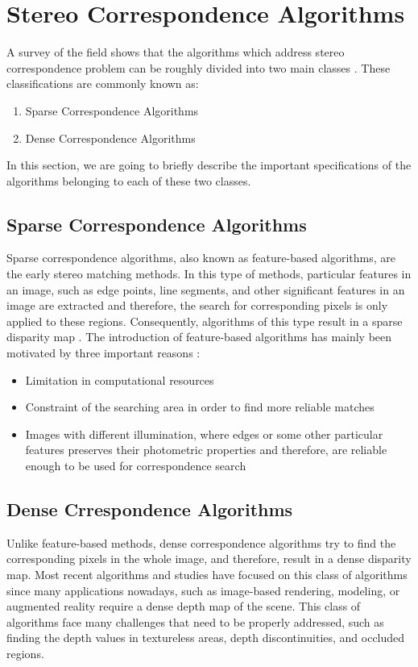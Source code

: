 \documentclass[dvips,letterpaper,12pt]{report}
\begin{document}
\section{Stereo Correspondence Algorithms}
A survey of the field shows that the algorithms which address stereo correspondence problem can be roughly divided into two main classes \cite{sch02}. These classifications are commonly known as:
\begin{enumerate}
\item Sparse Correspondence Algorithms
\item Dense Correspondence Algorithms 
\end{enumerate}

In this section, we are going to briefly describe the important specifications of the algorithms belonging to each of these two classes.
\subsection{Sparse Correspondence Algorithms}
Sparse correspondence algorithms, also known as feature-based algorithms, are the early stereo matching methods. In this type of methods, particular features in an image, such as edge 
points, line segments, and other significant features in an image are extracted and therefore, the search for corresponding pixels is only applied to these regions. Consequently, algorithms of this
type result in a sparse disparity map \cite{matt89,hsie92, sze11}. The introduction of feature-based algorithms has mainly been motivated by three important reasons \cite{sze11}:
\begin{itemize}
\item Limitation in computational resources
\item Constraint of the searching area in order to find more reliable matches
\item Images with different illumination, where edges or some other particular features preserves their photometric properties and therefore, are reliable enough to be used for
correspondence search
\end{itemize}

\subsection{Dense Crrespondence Algorithms}
Unlike feature-based methods, dense correspondence algorithms try to find the
corresponding pixels in the whole image, and therefore, result in a dense disparity map. Most recent algorithms and studies have focused on this class of algorithms since many applications 
nowadays, such as image-based rendering, modeling, or augmented reality require a dense depth map of the scene. This class of algorithms face many challenges that need to be properly
addressed, such as finding the depth values in textureless areas, depth discontinuities, and occluded regions.
\end{document}
